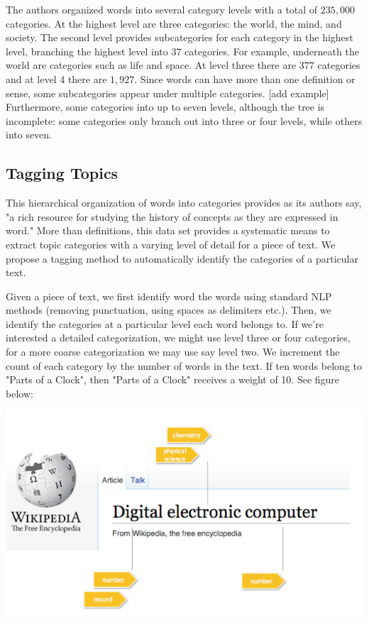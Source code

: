 \documentclass[a4paper, 12pt]{article}
\begin{document}
The authors organized words into several category levels with a total of $235,000$ categories. At the highest level are three categories:
the world, the mind, and society. 
The second level provides subcategories for each category in the highest level, branching the highest level into 37 categories. 
For example, underneath the world are categories such as life and space. 
At level three there are $377$ categories and at level 4 there are $1,927$. 
Since words can have more than one definition or sense, some subcategories appear under multiple categories.
[add example]
Furthermore, some categories into up to seven levels, although the tree is incomplete: 
some categories only branch out into three or four levels, while others into seven.



\subsection*{Tagging Topics}

This hierarchical organization of words into categories provides as its authors say, 
"a rich resource for studying the history of concepts as they are expressed in word."
More than definitions, this data set provides a systematic means to extract topic categories with 
a varying level of detail for a piece of text. We propose a tagging method to automatically identify the categories of a particular text.

Given a piece of text, we first identify word the words using standard NLP methods 
(removing punctuation, using spaces as delimiters etc.). Then, we identify the categories at a particular 
level each word belongs to. If we're interested a detailed categorization, we might use level three or four categories, for a more coarse categorization we may use say level two.
We increment the count of each category by the number of words in the text.  
If ten words belong to "Parts of a Clock", then "Parts of a Clock" receives a weight of 10.
See figure below:


\includegraphics[width=\textwidth]{title_tags}  
\end{document}

